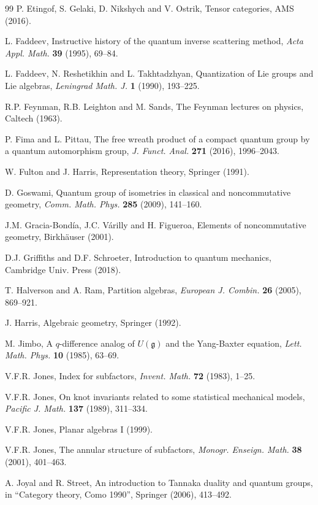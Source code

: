 \documentclass[12pt]{amsbook}
\begin{document}
\begin{thebibliography}{99}
P. Etingof, S. Gelaki, D. Nikshych and V. Ostrik, Tensor categories, AMS (2016).

L. Faddeev, Instructive history of the quantum inverse scattering method, {\em Acta Appl. Math.} {\bf 39} (1995), 69--84.

L. Faddeev, N. Reshetikhin and L. Takhtadzhyan, Quantization of Lie groups  and Lie algebras, {\em Leningrad Math. J.} {\bf 1} (1990), 193--225.

R.P. Feynman, R.B. Leighton and M. Sands, The Feynman lectures on physics, Caltech (1963).

P. Fima and L. Pittau, The free wreath product of a compact quantum group by a quantum automorphism group, {\em J. Funct. Anal.} {\bf 271} (2016), 1996--2043.

W. Fulton and J. Harris, Representation theory, Springer (1991).

D. Goswami, Quantum group of isometries in classical and noncommutative geometry, {\em Comm. Math. Phys.} {\bf 285} (2009), 141--160.

J.M. Gracia-Bond\'ia, J.C. V\'arilly and H. Figueroa, Elements of noncommutative geometry, Birkh\"auser (2001).

D.J. Griffiths and D.F. Schroeter, Introduction to quantum mechanics, Cambridge Univ. Press (2018).

T. Halverson and A. Ram, Partition algebras, {\em European J. Combin.} {\bf 26} (2005), 869--921.

J. Harris, Algebraic geometry, Springer (1992).

M. Jimbo, A $q$-difference analog of $U(\mathfrak g)$ and the Yang-Baxter equation, {\em Lett. Math. Phys.} {\bf 10} (1985), 63--69.

V.F.R. Jones, Index for subfactors, {\em Invent. Math.} {\bf 72} (1983), 1--25.

V.F.R. Jones, On knot invariants related to some statistical mechanical models, {\em Pacific J. Math.} {\bf 137} (1989), 311--334.

V.F.R. Jones, Planar algebras I (1999).

V.F.R. Jones, The annular structure of subfactors, {\em Monogr. Enseign. Math.} {\bf 38} (2001), 401--463.

A. Joyal and R. Street, An introduction to Tannaka duality and quantum groups, in ``Category theory, Como 1990'', Springer (2006), 413--492.


\end{thebibliography}
\end{document}
